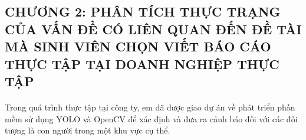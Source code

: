 \begin{flushleft}
    \fontsize{16}{20}\selectfont
    \section*{CHƯƠNG 2: PHÂN TÍCH THỰC TRẠNG CỦA VẤN ĐỀ CÓ LIÊN QUAN ĐẾN
    ĐỀ TÀI MÀ SINH VIÊN CHỌN VIẾT BÁO CÁO THỰC TẬP TẠI DOANH NGHIỆP THỰC TẬP}
    \fontsize{13}{20}\selectfont
    \paragraph{}
    \fontsize{13}{20}\selectfont Trong quá trình thực tập tại công ty, em đã được giao dự án về phát triển phần mềm sử dụng YOLO và OpenCV để xác định và đưa ra cảnh báo đối với các đối tượng là con người trong một khu vực cụ thể.\\
    \setcounter{section}{2}
    \setcounter{subsection}{0}

\end{flushleft}
